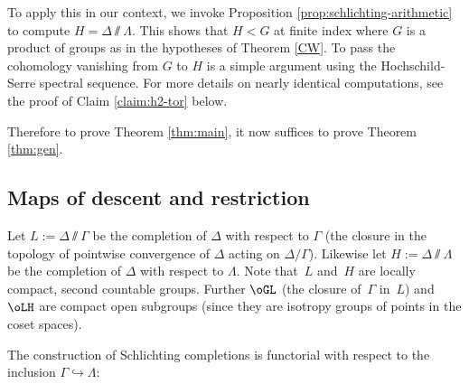 To apply this in our context, we invoke Proposition \ref{prop:schlichting-arithmetic} to compute
$H=\Delta \sslash \Lambda$. This shows that $H<G$ at finite index where $G$ is a product of groups
as in the hypotheses of Theorem \ref{CW}. To pass the cohomology vanishing from $G$ to $H$ is a simple argument using the Hochschild-Serre spectral sequence. For more details on nearly identical computations, see the proof of Claim \ref{claim:h2-tor} below.

Therefore to prove Theorem \ref{thm:main}, it now suffices to prove Theorem \ref{thm:gen}.

\subsection{Maps of descent and restriction} \label{sec:restrict}
Let $L:=\Delta \sslash \Gamma$ be the completion of $\Delta$ with respect to $\Gamma$ (\ie the closure in the topology of pointwise convergence of $\Delta$ acting on $\Delta / \Gamma$). Likewise let $H:=\Delta\sslash\Lambda$ be the completion of $\Delta$ with respect to $\Lambda$. Note that~$L$ and~$H$ are locally compact, second countable groups. Further $\oGL$ (the closure of~$\Gamma$ in~$L$) and~$\oLH$ are compact open subgroups (since they are isotropy groups of points in the coset spaces).

The construction of Schlichting completions is functorial with respect to the inclusion $\Gamma\hookrightarrow \Lambda$:

